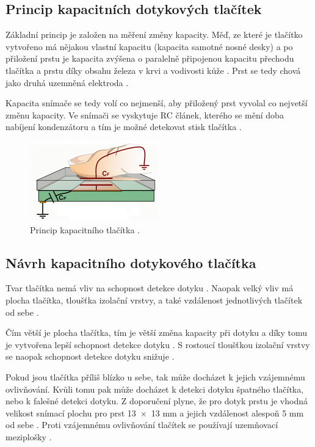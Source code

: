 \subsection{Princip kapacitních dotykových tlačítek}
Základní princip je založen na měření změny kapacity. Měď, ze které je tlačítko vytvořeno má
nějakou vlastní kapacitu (kapacita samotné nosné desky) a po přiložení prstu je kapacita zvýšena o paralelně 
připojenou kapacitu přechodu tlačítka a prstu díky obsahu železa v krvi a vodivosti kůže \cite{PrincipKapTl}. 
Prst se tedy chová jako druhá uzemněná elektroda \cite{PrincipKapTl}. 

Kapacita snímače se tedy volí co nejmenší, aby přiložený prst vyvolal co nejvetší změnu kapacity. Ve snímači se vyskytuje
RC článek, kterého se mění doba nabíjení kondenzátoru a tím je možné detekovat stisk tlačítka \cite{PrincipKapTl}. 

\begin{figure}[!h]
  \begin{center}
    \includegraphics[scale=1]{obrazky/kapacitni_princip.png}
  \end{center}
  \caption[Princip kapacitního tlačítka]{Princip kapacitního tlačítka \cite{PrincipKapTl}.}
\end{figure}

\subsection{Návrh kapacitního dotykového tlačítka}
Tvar tlačítka nemá vliv na schopnost detekce dotyku \cite{PrincipKapTl}. Naopak velký vliv má plocha tlačítka, tloušťka
izolační vrstvy, a také vzdálenost jednotlivých tlačítek od sebe \cite{PrincipKapTl}. 

Čím větší je plocha tlačítka, tím je větší změna kapacity při dotyku a díky tomu je vytvořena lepší schopnost detekce 
dotyku \cite{PrincipKapTl}. S rostoucí tloušťkou izolační vrstvy se naopak schopnost detekce dotyku snižuje \cite{PrincipKapTl}.

Pokud jsou tlačítka příliš blízko u sebe, tak může docházet k jejich vzájemnému ovlivňování. Kvůli tomu pak může docházet k
detekci dotyku špatného tlačítka, nebo k falešné detekci dotyku. Z doporučení plyne, že pro dotyk prstu je vhodná velikost snímací 
plochu pro prst 13~$\times$~13 mm a jejich vzdálenost alespoň 5 mm od sebe \cite{PrincipKapTl}. Proti vzájemnému ovlivňování tlačítek
se používají uzemňovací meziplošky \cite{PrincipKapTl}. 

